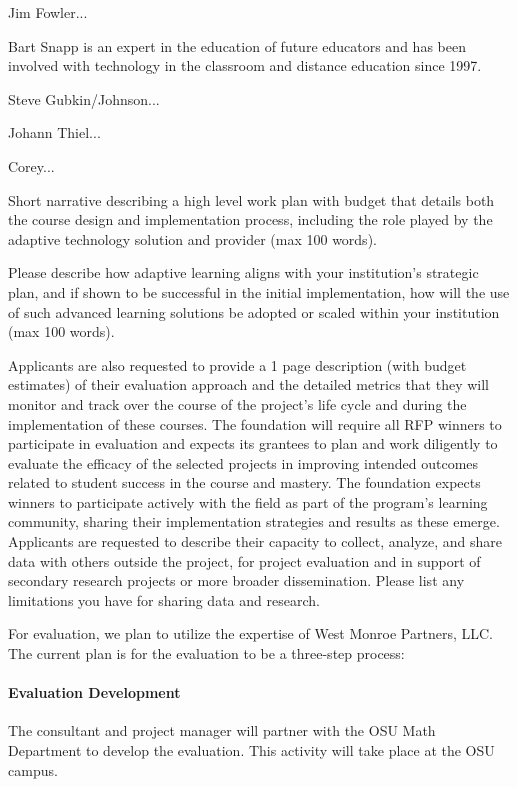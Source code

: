 Jim Fowler...

Bart Snapp is an expert in the education of future educators and has
been involved with technology in the classroom and distance education
since 1997.

Steve Gubkin/Johnson... 

Johann Thiel...

Corey...




\begin{question}
Short narrative describing a high level work plan with budget
that details both the course design and implementation process,
including the role played by the adaptive technology solution and
provider (max 100 words).
\end{question}


\begin{question}
Please describe how adaptive learning aligns with your
institution’s strategic plan, and if shown to be successful in the
initial implementation, how will the use of such advanced learning
solutions be adopted or scaled within your institution (max 100
words).
\end{question}


\begin{question}
Applicants are also requested to provide a 1 page description
(with budget estimates) of their evaluation approach and the
detailed metrics that they will monitor and track over the course of
the project’s life cycle and during the implementation of these
courses. The foundation will require all RFP winners to participate
in evaluation and expects its grantees to plan and work diligently
to evaluate the efficacy of the selected projects in improving
intended outcomes related to student success in the course and
mastery. The foundation expects winners to participate actively with
the field as part of the program’s learning community, sharing their
implementation strategies and results as these emerge. Applicants
are requested to describe their capacity to collect, analyze, and
share data with others outside the project, for project evaluation
and in support of secondary research projects or more broader
dissemination. Please list any limitations you have for sharing data
and research.
\end{question}

For evaluation, we plan to utilize the expertise of West Monroe
Partners, LLC. The current plan is for the evaluation to be a three-step process:
\paragraph{Evaluation Development} The consultant and project
  manager will partner with the OSU Math Department to develop the
  evaluation.  This activity will take place at the OSU campus.
